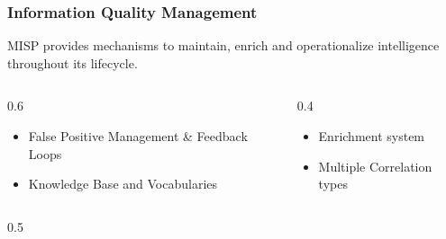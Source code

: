 \begin{frame}
    \frametitle{Information Quality Management}

    MISP provides mechanisms to maintain, enrich and operationalize intelligence throughout its lifecycle.

    \begin{center}
        \begin{columns}[T]
            \begin{column}{0.6\textwidth}
                    {
                        {\setlength{\leftmargini}{1.0em}
                        \begin{itemize}
                            \item False Positive Management \& Feedback Loops
                            \item Knowledge Base and Vocabularies\\
                        \end{itemize}
                        }
                    }
            \end{column}
            \hfill
            \begin{column}{0.4\textwidth}
                    {
                        {\setlength{\leftmargini}{1.0em}
                        \begin{itemize}
                            \item Enrichment system
                            \item Multiple Correlation types\\
                                \hspace{1em}{\small Raw, Fuzzy Hash, CDIR}
                        \end{itemize}
                        }
                    }
            \end{column}
        \end{columns}
        \begin{columns}[T]
            \begin{column}{0.5\textwidth}
                    {
}
\end{column}
\end{columns}
\end{center}
\end{frame}
